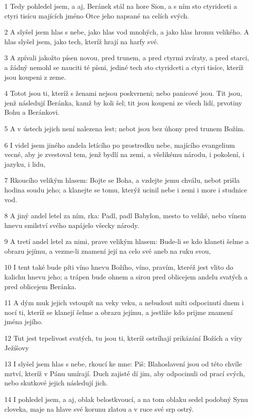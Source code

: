 \par 1 Tedy pohledel jsem, a aj, Beránek stál na hore Sion, a s ním sto ctyridceti a ctyri tisícu majících jméno Otce jeho napsané na celích svých.
\par 2 A slyšel jsem hlas s nebe, jako hlas vod mnohých, a jako hlas hromu velikého. A hlas slyšel jsem, jako tech, kteríž hrají na harfy své.
\par 3 A zpívali jakožto písen novou, pred trunem, a pred ctyrmi zvíraty, a pred starci, a žádný nemohl se nauciti té písni, jediné tech sto ctyridceti a ctyri tisíce, kteríž jsou koupeni z zeme.
\par 4 Totot jsou ti, kteríž s ženami nejsou poskvrneni; nebo panicové jsou. Tit jsou, jenž následují Beránka, kamž by koli šel; tit jsou koupeni ze všech lidí, prvotiny Bohu a Beránkovi.
\par 5 A v ústech jejich není nalezena lest; nebot jsou bez úhony pred trunem Božím.
\par 6 I videl jsem jiného andela letícího po prostredku nebe, majícího evangelium vecné, aby je zvestoval tem, jenž bydlí na zemi, a všelikému národu, i pokolení, i jazyku, i lidu,
\par 7 Rkoucího velikým hlasem: Bojte se Boha, a vzdejte jemu chválu, nebot prišla hodina soudu jeho; a klanejte se tomu, kterýž ucinil nebe i zemi i more i studnice vod.
\par 8 A jiný andel letel za ním, rka: Padl, padl Babylon, mesto to veliké, nebo vínem hnevu smilství svého napájelo všecky národy.
\par 9 A tretí andel letel za nimi, prave velikým hlasem: Bude-li se kdo klaneti šelme a obrazu jejímu, a vezme-li znamení její na celo své aneb na ruku svou,
\par 10 I tent také bude píti víno hnevu Božího, víno, pravím, kteréž jest vlito do kalichu hnevu jeho; a trápen bude ohnem a sirou pred oblicejem andelu svatých a pred oblicejem Beránka.
\par 11 A dým muk jejich vstoupít na veky veku, a nebudout míti odpocinutí dnem i nocí ti, kteríž se klanejí šelme a obrazu jejímu, a jestliže kdo prijme znamení jména jejího.
\par 12 Tut jest trpelivost svatých, tu jsou ti, kteríž ostríhají prikázání Božích a víry Ježíšovy
\par 13 I slyšel jsem hlas s nebe, rkoucí ke mne: Piš: Blahoslavení jsou od této chvíle mrtví, kteríž v Pánu umírají. Duch zajisté dí jim, aby odpocinuli od prací svých, nebo skutkové jejich následují jich.
\par 14 I pohledel jsem, a aj, oblak belostkvoucí, a na tom oblaku sedel podobný Synu cloveka, maje na hlave své korunu zlatou a v ruce své srp ostrý.
